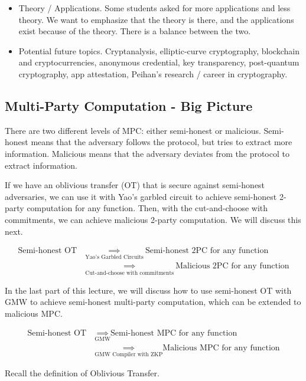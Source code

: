 \begin{itemize}
    \item Theory / Applications. Some students asked for more applications and less theory. We want to emphasize that the theory is there, and the applications exist because of the theory. There is a balance between the two.
    \item Potential future topics. Cryptanalysis, elliptic-curve cryptography, blockchain and cryptocurrencies, anonymous credential, key transparency, post-quantum cryptography, app attestation, Peihan's research / career in cryptography.
\end{itemize}

\subsection{Multi-Party Computation - Big Picture}

There are two different levels of MPC: either semi-honest or malicious. Semi-honest means that the adversary follows the protocol, but tries to extract more information. Malicious means that the adversary deviates from the protocol to extract information.

If we have an oblivious transfer (OT) that is secure against semi-honest adversaries, we can use it with Yao's garbled circuit to achieve semi-honest 2-party computation for any function. Then, with the cut-and-choose with commitments, we can achieve malicious 2-party computation. We will discuss this next.

\begin{align*}
    \text{Semi-honest OT}\ & \underset{\text{Yao's Garbled Circuits}}{\implies}\ \text{Semi-honest 2PC for any function} \\
    & \underset{\text{Cut-and-choose with commitments}}{\implies}\ \text{Malicious 2PC for any function}
\end{align*}

In the last part of this lecture, we will discuss how to use semi-honest OT with GMW to achieve semi-honest multi-party computation, which can be extended to malicious MPC.

\begin{align*}
    \text{Semi-honest OT} \ & \underset{\text{GMW}}{\implies} \text{Semi-honest MPC for any function}\\
    & \underset{\text{GMW Compiler with ZKP}}{\implies} \text{Malicious MPC for any function}
\end{align*}

Recall the definition of Oblivious Transfer.

